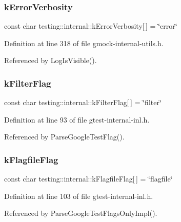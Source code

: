 \subsubsection{\texorpdfstring{k\+Error\+Verbosity}{kErrorVerbosity}}
{\footnotesize\ttfamily const char testing\+::internal\+::k\+Error\+Verbosity\mbox{[}$\,$\mbox{]} = \char`\"{}error\char`\"{}}



Definition at line 318 of file gmock-\/internal-\/utils.\+h.



Referenced by Log\+Is\+Visible().

\mbox{\label{namespacetesting_1_1internal_a8cb8ee7fe7659e6916a0108dffa2f7dc}} 
\subsubsection{\texorpdfstring{k\+Filter\+Flag}{kFilterFlag}}
{\footnotesize\ttfamily const char testing\+::internal\+::k\+Filter\+Flag\mbox{[}$\,$\mbox{]} = \char`\"{}filter\char`\"{}}



Definition at line 93 of file gtest-\/internal-\/inl.\+h.



Referenced by Parse\+Google\+Test\+Flag().

\mbox{\label{namespacetesting_1_1internal_aa1ffe15dea227d4dded912e43a8eed84}} 
\subsubsection{\texorpdfstring{k\+Flagfile\+Flag}{kFlagfileFlag}}
{\footnotesize\ttfamily const char testing\+::internal\+::k\+Flagfile\+Flag\mbox{[}$\,$\mbox{]} = \char`\"{}flagfile\char`\"{}}



Definition at line 103 of file gtest-\/internal-\/inl.\+h.



Referenced by Parse\+Google\+Test\+Flags\+Only\+Impl().

